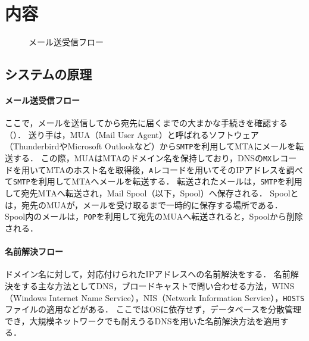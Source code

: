 \section{内容}
\begin{wrapfigure}{r}[0mm]{.48\textwidth}
    \vspace{-.5cm}
    
    \caption{メール送受信フロー\footnotemark[1]}
    \label{fig:メール送受信フロー}
    \vspace{-.5cm}
\end{wrapfigure}
\newcommand{\smtp}{\texttt{SMTP}}
\newcommand{\pop}{\texttt{POP}}
\newcommand{\imap}{\texttt{IMAP}}
\subsection{システムの原理}
\paragraph{メール送受信フロー}
ここで，メールを送信してから宛先に届くまでの大まかな手続きを確認する（）．
送り手は，MUA（Mail User Agent）と呼ばれるソフトウェア（ThunderbirdやMicrosoft Outlookなど）から\smtp を利用してMTAにメールを転送する．
この際，MUAはMTAのドメイン名を保持しており，DNSの\texttt{MX}レコードを用いてMTAのホスト名を取得後，\texttt{A}レコードを用いてそのIPアドレスを調べて\smtp を利用してMTAへメールを転送する．
転送されたメールは，\smtp を利用して宛先MTAへ転送され，Mail Spool（以下，Spool）へ保存される．
Spoolとは，宛先のMUAが，メールを受け取るまで一時的に保存する場所である．
Spool内のメールは，\pop を利用して宛先のMUAへ転送されると，Spoolから削除される．
\paragraph{名前解決フロー}
ドメイン名に対して，対応付けられたIPアドレスへの名前解決をする．
名前解決をする主な方法としてDNS，ブロードキャストで問い合わせる方法\cite[p.135]{いちばんやさしいネットワークの本}，WINS（Windows Internet Name Service），NIS（Network Information Service），\texttt{HOSTS}ファイルの適用などがある．
ここではOSに依存せず，データベースを分散管理でき，大規模ネットワークでも耐えうるDNSを用いた名前解決方法を適用する\cite[p.10\ -\ p.11]{DNSBIND}．

